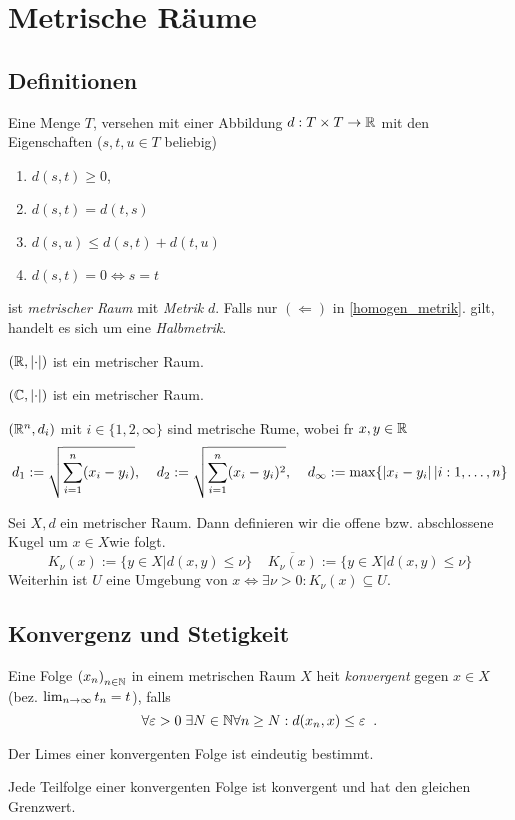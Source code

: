 \chapter{Metrische R\"aume}
\section{Definitionen}

\begin{definition} \label{def_metrik}
	Eine Menge $T$, versehen mit einer Abbildung \(d: T \times T \to \mathbb{R}\) mit den Eigenschaften (\(s,t,u \in T\) beliebig)
	\begin{enumerate}[noitemsep]
		\item \(d(s,t)\geq 0\),
		\item \(d(s,t) = d(t,s)\)
		\item \(d(s,u) \leq d(s,t) + d(t,u)\)
		\item \(d(s,t) = 0 \iff s = t\) \label{homogen_metrik}	\end{enumerate}
	ist \textit{metrischer Raum} mit \textit{Metrik} $d$. Falls nur $(\Leftarrow)$ in \ref{homogen_metrik}. gilt, handelt es sich um eine \textit{Halbmetrik}. 
\end{definition}

\begin{ex}
	\((\mathbb{R}, \left\lvert \cdot \right\rvert)\) ist ein metrischer Raum.
\end{ex}
\begin{ex}
\((\mathbb{C}, \left\lvert \cdot \right\rvert )\) ist ein metrischer Raum. 
\end{ex}
\begin{ex}
	\((\mathbb{R}^n, d_i)\) mit \(i \in \{1,2,\infty\}\) sind metrische R\as ume, wobei f\us r \(x,y \in \mathbb{R}\)
	\[d_1 := \sqrt{\sum_{i=1}^n  (x_i -y_i) },\;\;\;\; d_2 := \sqrt{\sum_{i = 1}^n (x_i - y_i)^2}, \;\;\;\; d_\infty := \max \{\left\lvert x_i - y_i \right\rvert\vert i: 1,\ldots, n\}\]
\end{ex}
\begin{definition}
	Sei \(X,d\) ein metrischer Raum. Dann definieren wir die offene bzw. abschlossene Kugel um \(x\in X\)wie folgt.
	\[K_\nu (x) := \{y \in X \vert d(x,y) \leq \nu\} \;\;\;\; \overline{K_\nu(x)} := \{y \in X \vert d(x,y) \leq \nu \}\]
	Weiterhin ist \(U \text{ eine Umgebung von } x \iff \exists \nu > 0: K_\nu(x) \subseteq U\).
\end{definition}

\section{Konvergenz und Stetigkeit}
\begin{definition}
	Eine Folge \(\left (x_n\right )_{n\in \mathbb{N}}\)  in einem metrischen Raum $X$ hei\s t \textit{konvergent} gegen $x \in X$  (bez. $\lim_{n \to \infty} t_n  = t$), falls 
	\[\forall \varepsilon > 0 \;\exists N \in \mathbb{N} \forall n \geq N: d(x_n, x) \leq \varepsilon \;\;.\]
\end{definition}
\begin{theorem}
	Der Limes einer konvergenten Folge ist eindeutig bestimmt. 
\end{theorem}
\begin{theorem}
	Jede Teilfolge einer konvergenten Folge ist konvergent und hat den gleichen Grenzwert.
\end{theorem}

